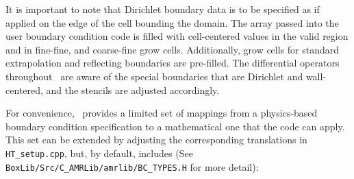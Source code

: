 It is important to note that Dirichlet boundary data is to be specified as 
if applied on the edge of the cell bounding the domain. The array passed into the 
user boundary condition code is filled with cell-centered values in the valid 
region and in fine-fine, and coarse-fine grow cells.  Additionally, grow cells 
for standard extrapolation and reflecting boundaries are pre-filled.  The 
differential operators throughout \lmc\ are aware of the special boundaries
that are Dirichlet and wall-centered, and the stencils are adjusted accordingly.

For convenience, \lmc\ provides a limited set of mappings from a physics-based boundary condition
specification to a mathematical one that the code can apply.  This set can be extended
by adjusting the corresponding translations in {\tt HT\_setup.cpp}, but, by default, includes 
(See {\tt BoxLib/Src/C\_AMRLib/amrlib/BC\_TYPES.H} for more detail):
